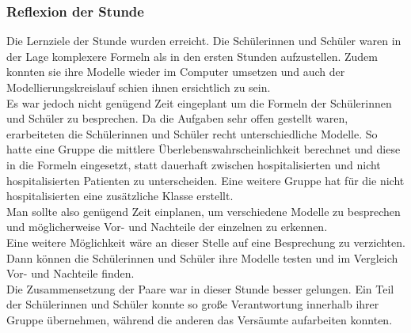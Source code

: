 \subsubsection*{Reflexion der Stunde}
Die Lernziele der Stunde wurden erreicht. Die Schülerinnen und Schüler waren in der Lage komplexere Formeln als in den ersten Stunden aufzustellen. Zudem konnten sie ihre Modelle wieder im Computer umsetzen und auch der Modellierungskreislauf schien ihnen ersichtlich zu sein.\\
Es war jedoch nicht genügend Zeit eingeplant um die Formeln der Schülerinnen und Schüler zu besprechen. Da die Aufgaben sehr offen gestellt waren, erarbeiteten die Schülerinnen und Schüler recht unterschiedliche Modelle. So hatte eine Gruppe die mittlere Überlebenswahrscheinlichkeit berechnet und diese in die Formeln eingesetzt, statt dauerhaft zwischen hospitalisierten und nicht hospitalisierten Patienten zu unterscheiden. Eine weitere Gruppe hat für die nicht hospitalisierten eine zusätzliche Klasse erstellt.\\
Man sollte also genügend Zeit einplanen, um verschiedene Modelle zu besprechen und möglicherweise Vor- und Nachteile der einzelnen zu erkennen.\\
Eine weitere Möglichkeit wäre an dieser Stelle auf eine Besprechung zu verzichten. Dann können die Schülerinnen und Schüler ihre Modelle testen und im Vergleich Vor- und Nachteile finden. \\
Die Zusammensetzung der Paare war in dieser Stunde besser gelungen. Ein Teil der Schülerinnen und Schüler konnte so große Verantwortung innerhalb ihrer Gruppe übernehmen, während die anderen das Versäumte aufarbeiten konnten. 
\newpage
